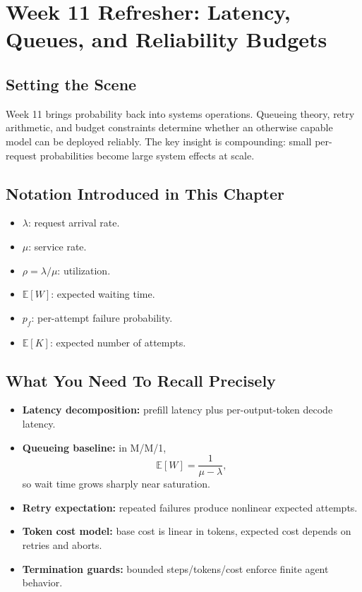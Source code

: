 \section{Week 11 Refresher: Latency, Queues, and Reliability Budgets}

\subsection*{Setting the Scene}
Week 11 brings probability back into systems operations. Queueing theory, retry arithmetic, and budget constraints determine whether an otherwise capable model can be deployed reliably. The key insight is compounding: small per-request probabilities become large system effects at scale.

\subsection*{Notation Introduced in This Chapter}
\begin{itemize}[leftmargin=1.5em]
  \item $\lambda$: request arrival rate.
  \item $\mu$: service rate.
  \item $\rho=\lambda/\mu$: utilization.
  \item $\mathbb{E}[W]$: expected waiting time.
  \item $p_f$: per-attempt failure probability.
  \item $\mathbb{E}[K]$: expected number of attempts.
\end{itemize}

\subsection*{What You Need To Recall Precisely}
\begin{itemize}[leftmargin=1.5em]
  \item \textbf{Latency decomposition:} prefill latency plus per-output-token decode latency.
  \item \textbf{Queueing baseline:} in M/M/1,
  \[
    \mathbb{E}[W]=\frac{1}{\mu-\lambda},
  \]
  so wait time grows sharply near saturation.
  \item \textbf{Retry expectation:} repeated failures produce nonlinear expected attempts.
  \item \textbf{Token cost model:} base cost is linear in tokens, expected cost depends on retries and aborts.
  \item \textbf{Termination guards:} bounded steps/tokens/cost enforce finite agent behavior.
\end{itemize}

